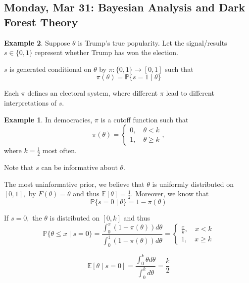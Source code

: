 \documentclass[10pt, oneside]{article}
\newcommand{\bbP}{\mathbb{P}}
\newcommand{\bbE}{\mathbb{E}}
\theoremstyle{definition}
\newtheorem{exmp}{Example}[section]
\begin{document}
\subsection{Monday, Mar 31: Bayesian Analysis and Dark Forest Theory}
\begin{exmp}
    Suppose $\theta$ is Trump's true popularity. Let the signal/results $s \in \{0,1\}$ represent whether Trump has won the election.

    $s$ is generated conditional on $\theta$ by $\pi: \{0,1\} \to [0,1]$ such that 
    \[\pi(\theta) = \bbP\{s = 1 \mid \theta\}\]

    Each $\pi$ defines an electoral system, where different $\pi$ lead to different interpretations of $s.$ 
    \begin{exmp}
        In democracies, $\pi$ is a cutoff function such that 
        \[\pi(\theta) = \begin{cases}
            0, \quad \theta < k\\
            1, \quad \theta \geq k
        \end{cases},\] where $k = \frac{1}{2}$ most often.
    \end{exmp}
    Note that $s$ can be informative about $\theta.$ 

    The most uninformative prior, we believe that $\theta$ is uniformly distributed on $[0,1],$ by $F(\theta)  = \theta$ and thus $\bbE[\theta] = \frac{1}{2}.$ Moreover, we know that 
    \[\bbP\{s = 0 \mid \theta\} = 1- \pi(\theta)\]

    If $s = 0,$ the $\theta$ is distributed on $[0,k]$ and thus 
    \[\bbP\{\theta \leq x \mid s = 0\} = \frac{\int_0^x (1 - \pi(\theta))d\theta}{\int_0^1 (1 - \pi(\theta))d\theta} = \begin{cases}
        \frac{x}{k}, \quad x < k\\
        1, \quad x\geq k
    \end{cases}\]

    
    \[\bbE[\theta \mid s= 0] = \frac{\int_0^k \theta d\theta}{\int_0^k d\theta} = \frac{k}{2}\]
\end{exmp}
\end{document}
